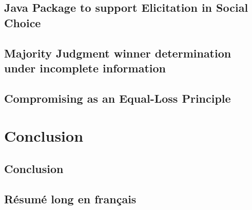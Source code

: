\documentclass[a4paper, 11pt,twoside,openright]{book}
\begin{document}
	\chapter{Java Package to support Elicitation in Social Choice}
		\label{ch:uml}
		
	\chapter{Majority Judgment winner determination under incomplete information}
		\label{ch:MJ}
		

	\chapter{Compromising as an Equal-Loss Principle}
	\label{ch:compromise}
		

\part{Conclusion}
	\chapter{Conclusion}
		\label{ch:conclusion}
		




\backmatter
{}



 

\chapter{Résumé long en français}

\end{document}
